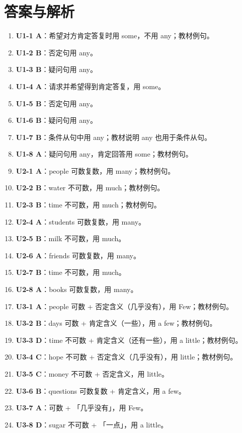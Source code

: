 \documentclass[11pt,a4paper]{ctexart}
\begin{document}
\section*{答案与解析}
\small
\begin{enumerate}[leftmargin=1.6em,itemsep=2pt]
\item \textbf{U1-1 A}：希望对方肯定答复时用 some，不用 any；教材例句。
\item \textbf{U1-2 B}：否定句用 any。
\item \textbf{U1-3 B}：疑问句用 any。
\item \textbf{U1-4 A}：请求并希望得到肯定答复，用 some。
\item \textbf{U1-5 B}：否定句用 any。
\item \textbf{U1-6 B}：疑问句用 any。
\item \textbf{U1-7 B}：条件从句中用 any；教材说明 any 也用于条件从句。
\item \textbf{U1-8 A}：疑问句用 any，肯定回答用 some；教材例句。
\item \textbf{U2-1 A}：people 可数复数，用 many；教材例句。
\item \textbf{U2-2 B}：water 不可数，用 much；教材例句。
\item \textbf{U2-3 B}：time 不可数，用 much；教材例句。
\item \textbf{U2-4 A}：students 可数复数，用 many。
\item \textbf{U2-5 B}：milk 不可数，用 much。
\item \textbf{U2-6 A}：friends 可数复数，用 many。
\item \textbf{U2-7 B}：time 不可数，用 much。
\item \textbf{U2-8 A}：books 可数复数，用 many。
\item \textbf{U3-1 A}：people 可数 + 否定含义（几乎没有），用 Few；教材例句。
\item \textbf{U3-2 B}：days 可数 + 肯定含义（一些），用 a few；教材例句。
\item \textbf{U3-3 D}：time 不可数 + 肯定含义（还有一些），用 a little；教材例句。
\item \textbf{U3-4 C}：hope 不可数 + 否定含义（几乎没有），用 little；教材例句。
\item \textbf{U3-5 C}：money 不可数 + 否定含义，用 little。
\item \textbf{U3-6 B}：questions 可数复数 + 肯定含义，用 a few。
\item \textbf{U3-7 A}：可数 + 「几乎没有」，用 Few。
\item \textbf{U3-8 D}：sugar 不可数 + 「一点」，用 a little。

\end{enumerate}
\end{document}
